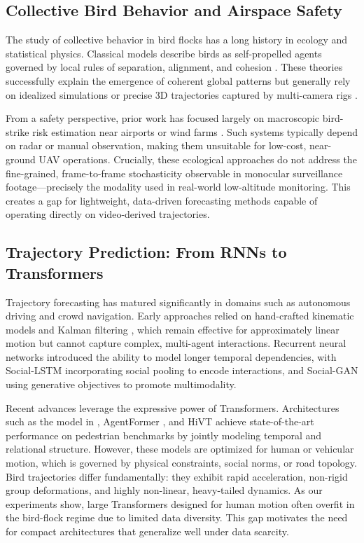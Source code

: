 \documentclass[journal]{IEEEtran}
\begin{document}
\subsection{Collective Bird Behavior and Airspace Safety}
The study of collective behavior in bird flocks has a long history in ecology and statistical physics. Classical models describe birds as self-propelled agents governed by local rules of separation, alignment, and cohesion \cite{Ballerini2008Interaction, Cavagna2010ScaleFree}. These theories successfully explain the emergence of coherent global patterns but generally rely on idealized simulations or precise 3D trajectories captured by multi-camera rigs \cite{Giardina2008Collective}. 

From a safety perspective, prior work has focused largely on macroscopic bird-strike risk estimation near airports or wind farms \cite{Nagelkerke2018Flight}. Such systems typically depend on radar or manual observation, making them unsuitable for low-cost, near-ground UAV operations. Crucially, these ecological approaches do not address the fine-grained, frame-to-frame stochasticity observable in monocular surveillance footage—precisely the modality used in real-world low-altitude monitoring. This creates a gap for lightweight, data-driven forecasting methods capable of operating directly on video-derived trajectories.

\subsection{Trajectory Prediction: From RNNs to Transformers}
Trajectory forecasting has matured significantly in domains such as autonomous driving and crowd navigation. Early approaches relied on hand-crafted kinematic models and Kalman filtering \cite{Rudenko2020Survey}, which remain effective for approximately linear motion but cannot capture complex, multi-agent interactions. Recurrent neural networks introduced the ability to model longer temporal dependencies, with Social-LSTM \cite{Alahi2016SocialLSTM} incorporating social pooling to encode interactions, and Social-GAN \cite{Gupta2018SocialGAN} using generative objectives to promote multimodality.

Recent advances leverage the expressive power of Transformers. Architectures such as the model in \cite{Giuliari2021Transformer}, AgentFormer \cite{Yuan2021AgentFormer}, and HiVT \cite{Liu2022HiVT} achieve state-of-the-art performance on pedestrian benchmarks by jointly modeling temporal and relational structure. However, these models are optimized for human or vehicular motion, which is governed by physical constraints, social norms, or road topology. Bird trajectories differ fundamentally: they exhibit rapid acceleration, non-rigid group deformations, and highly non-linear, heavy-tailed dynamics. As our experiments show, large Transformers designed for human motion often overfit in the bird-flock regime due to limited data diversity. This gap motivates the need for compact architectures that generalize well under data scarcity.
\end{document}
